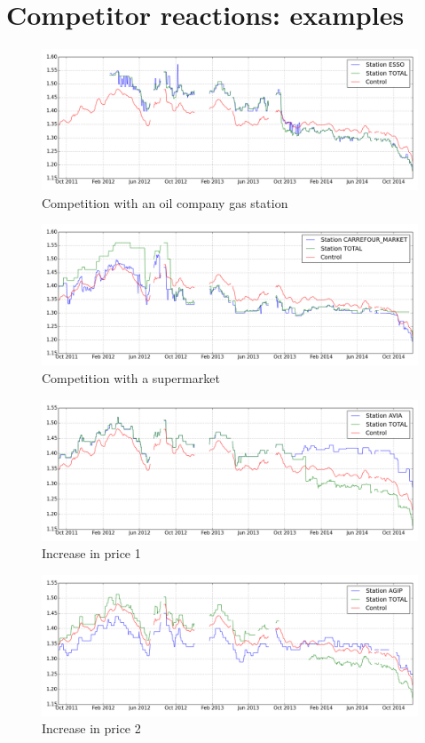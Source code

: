 \documentclass[11pt]{article}
\begin{document}
\section{Competitor reactions: examples}

\begin{figure}[H]
	\centering
		\includegraphics[width=16cm]{graphs/ex_0.png}
	\floatfoot{}
\caption{Competition with an oil company gas station}
\label{figure:fierce_competition}
\end{figure}

\begin{figure}[H]
	\centering
		\includegraphics[width=16cm]{graphs/ex_2.png}
	\floatfoot{}
\caption{Competition with a supermarket}
\label{figure:given_up}
\end{figure}

\begin{figure}[H]
	\centering
		\includegraphics[width=16cm]{graphs/ex_3.png}
	\floatfoot{}
\caption{Increase in price 1}
\label{figure:given_up}
\end{figure}

\begin{figure}[H]
	\centering
		\includegraphics[width=16cm]{graphs/ex_4.png}
	\floatfoot{}
\caption{Increase in price 2}
\label{figure:given_up}
\end{figure}
\end{document}
